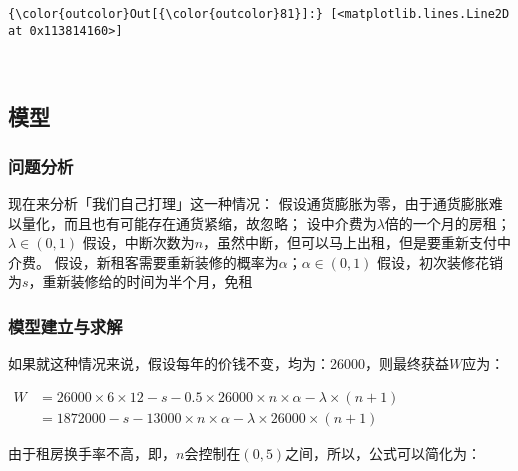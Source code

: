 \documentclass[11pt]{article}
\begin{document}
\begin{Verbatim}[commandchars=\\\{\}]
{\color{outcolor}Out[{\color{outcolor}81}]:} [<matplotlib.lines.Line2D at 0x113814160>]
\end{Verbatim}
            
    \begin{center}
    \end{center}
    { \hspace*{\fill} \\}
    
    \hypertarget{ux6a21ux578b}{%
\subsection{模型}\label{ux6a21ux578b}}

\hypertarget{ux95eeux9898ux5206ux6790}{%
\subsubsection{问题分析}\label{ux95eeux9898ux5206ux6790}}

现在来分析「我们自己打理」这一种情况：
假设通货膨胀为零，由于通货膨胀难以量化，而且也有可能存在通货紧缩，故忽略；
设中介费为\(\lambda\)倍的一个月的房租；\(\lambda \in (0,1)\)
假设，中断次数为\(n\)，虽然中断，但可以马上出租，但是要重新支付中介费。
假设，新租客需要重新装修的概率为\(\alpha\)；\(\alpha \in (0,1)\)
假设，初次装修花销为\(s\)，重新装修给的时间为半个月，免租

\hypertarget{ux6a21ux578bux5efaux7acbux4e0eux6c42ux89e3}{%
\subsubsection{模型建立与求解}\label{ux6a21ux578bux5efaux7acbux4e0eux6c42ux89e3}}

如果就这种情况来说，假设每年的价钱不变，均为：26000，则最终获益\(W\)应为：

\(\begin{align*}W &= 26000 \times 6 \times 12 - s - 0.5\times 26000 \times n \times \alpha - \lambda \times (n+1) \\ &= 1872000 - s - 13000 \times n \times \alpha - \lambda \times 26000 \times (n+1) \end{align*}\)

由于租房换手率不高，即，\(n\)会控制在\((0,5)\)之间，所以，公式可以简化为：
\end{document}
